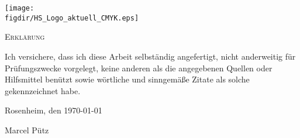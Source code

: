 \begin{titlepage}

\raggedleft

\texttt{[image: \\figdir/HS\_Logo\_aktuell\_CMYK.eps]}

\vfill

\centering
{}


\end{titlepage}

\cleardoubleemptypage

{
\large
\thispagestyle{empty}
\vspace*{\fill}

\noindent
\textsc{Erklärung}

\medskip

\noindent
Ich versichere, dass ich diese Arbeit selbständig
angefertigt, nicht anderweitig für Prüfungszwecke
vorgelegt, keine anderen als die angegebenen Quellen
oder Hilfsmittel benützt sowie wörtliche und
sinngemäße Zitate als solche gekennzeichnet habe.

\bigskip

\noindent
Rosenheim, den \today

\vspace*{2cm}

\noindent
Marcel Pütz
}

